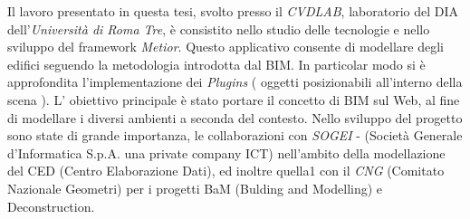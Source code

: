 Il lavoro presentato in questa tesi, svolto presso il \emph{CVDLAB}, laboratorio del DIA dell'\emph{Università
di Roma Tre}, è consistito nello studio delle tecnologie e nello sviluppo del framework \emph{Metior}.
Questo applicativo consente di modellare degli edifici seguendo la metodologia introdotta dal BIM.
In particolar modo si è approfondita l'implementazione dei \emph{Plugins} ( oggetti posizionabili all'interno della scena ).
L' obiettivo principale è stato portare il concetto di BIM sul Web, al fine di modellare i diversi ambienti a seconda del contesto.
Nello sviluppo del progetto sono state di grande importanza, le collaborazioni con \emph{SOGEI} -
(Società Generale d'Informatica S.p.A. una private company ICT) nell'ambito della modellazione del CED (Centro Elaborazione Dati),
ed inoltre quella1 con il \emph{CNG} (Comitato Nazionale Geometri) per i progetti BaM (Bulding and Modelling) e Deconstruction.
